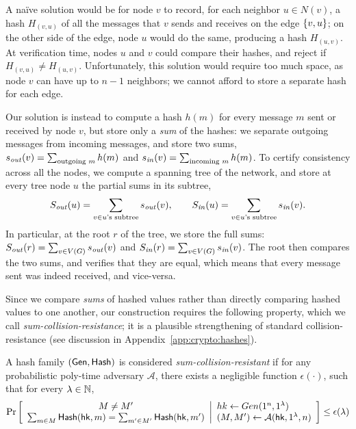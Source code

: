 A na\"ive solution would be for node $v$ to record, for each neighbor $u \in N(v)$,
a hash $H_{(v,u)}$ of all the messages that $v$ sends and receives on the edge $\left \{{v,u} \right \}$;
on the other side of the edge, node $u$ would do the same, producing a hash $H_{(u,v)}$.
At verification time, nodes $u$ and $v$ could compare their hashes, and reject if $H_{(v,u)} \neq H_{(u,v)}$.
Unfortunately, this solution would require too much space,
as node $v$ can have up to $n - 1$ neighbors;
we cannot afford to store a separate hash for each edge.

Our solution is instead to compute a hash $h(m)$
for every message $m$ sent or received by node $v$,
but store only a \emph{sum} of the hashes:
we separate outgoing messages from incoming messages,
and store two sums,
$s_{\mathit{ out }}(v) = \sum_{\text{outgoing $m$}} h(m)$
and
$s_{\mathit{ in }}(v) = \sum_{\text{incoming $m$}} h(m)$.
To certify consistency across all the nodes,
we compute a spanning tree of the network,
and store at every tree node $u$ the partial sums
in its subtree,
\begin{equation*}
	S_{\mathit{ out }}(u) = \sum_{v \in \text{$u$'s subtree}} s_{\mathit{ out }}(v),
	\qquad
	S_{\mathit{ in }}(u) = \sum_{v \in \text{$u$'s subtree}} s_{\mathit{ in }}(v).
\end{equation*}
In particular, at the root $r$ of the tree, we store the full sums:
	$S_{\mathit{ out }}(r) = \sum_{v \in V(G)} s_{\mathit{ out }}(v)$
	and
	$S_{\mathit{ in }}(r) = \sum_{v \in V(G)} s_{\mathit{ in }}(v)$.
The root then compares the two sums, and verifies that they are equal,
which means that every message sent was indeed received, and vice-versa.


Since we compare \emph{sums} of hashed values rather than
directly comparing hashed values to one another,
our construction requires the following property,
which we call \emph{sum-collision-resistance};
it is a plausible strengthening of standard collision-resistance (see discussion in Appendix~\ref{app:crypto:hashes}).

\begin{definition} 
    A hash family $(\mathsf{Gen}, \mathsf{Hash})$ is considered \emph{sum-collision-resistant} if for any probabilistic poly-time adversary $\mathcal{A}$, there exists a negligible function $\epsilon(\cdot)$, such that for every $\lambda\in \mathbb{N}$,
    \begin{gather*}
        \underset{}{\text{Pr}}\left [
        \begin{array}{cc}
        M \neq M' \\
        \sum_{ m \in M }\mathsf{Hash}(\mathsf{hk}, m) = \sum_{ m' \in M'}\mathsf{Hash}(\mathsf{hk}, m')
        \end{array}
        \middle\vert
        \begin{array}{ll}
             hk \leftarrow Gen(1^n, 1^\lambda) \\
             (M, M') \leftarrow\mathcal{A}(\mathsf{hk}, 1^\lambda, n)
        \end{array}
        \right ] \leq \epsilon(\lambda)
    \end{gather*}
\end{definition}


